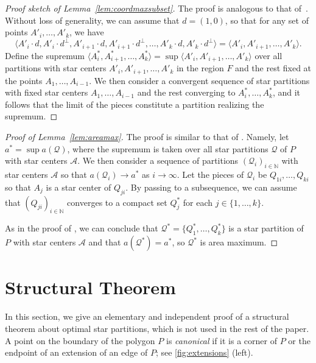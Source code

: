 \documentclass[10pt,a4paper]{article}
\newcommand{\NN}{\mathbb{N}}
\begin{document}
\begin{proof}[Proof sketch of Lemma~\ref{lem:coordmaxsubset}]
The proof is analogous to that of~.
Without loss of generality, we can assume that $d=(1,0)$, so that for any set of points $A'_i,\ldots,A'_k$, we have
\[\langle A'_i\cdot d, A'_i\cdot d^\perp,A'_{i+1}\cdot d, A'_{i+1}\cdot d^\perp,\ldots,A'_k\cdot d,A'_k\cdot d^\perp\rangle=\langle A'_i,A'_{i+1},\ldots,A'_k\rangle.\]
Define the supremum $\langle A^*_i,A^*_{i+1},\ldots,A^*_k\rangle=\sup \langle A'_i,A'_{i+1},\ldots,A'_k\rangle$ over all partitions with star centers $A'_i,A'_{i+1},\ldots,A'_k$ in the region $F$ and the rest fixed at the points $A_1,\ldots,A_{i-1}$.
We then consider a convergent sequence of star partitions with fixed star centers $A_1,\ldots,A_{i-1}$ and the rest converging to $A^*_i,\ldots,A^*_k$, and it follows that the limit of the pieces constitute a partition realizing the supremum.
\end{proof}

\begin{proof}[Proof of Lemma~\ref{lem:areamax}]
The proof is similar to that of .
Namely, let $a^*=\sup a(\mathcal Q)$, where the supremum is taken over all star partitions $\mathcal Q$ of $P$ with star centers $\mathcal A$.
We then consider a sequence of partitions $(\mathcal Q_i)_{i\in\NN}$ with star centers $\mathcal A$ so that $a(\mathcal Q_i)\longrightarrow a^*$ as $i\longrightarrow\infty$.
Let the pieces of $\mathcal Q_i$ be $Q_{1i},\ldots,Q_{ki}$ so that $A_j$ is a star center of $Q_{ji}$.
By passing to a subsequence, we can assume that $(Q_{ji})_{i\in\NN}$ converges to a compact set $Q_j^*$ for each $j\in\{1,\ldots,k\}$.

As in the proof of , we can conclude that $\mathcal Q^*=\{Q_1^*,\ldots,Q_k^*\}$ is a star partition of $P$ with star centers $\mathcal A$ and that $a(\mathcal Q^*)=a^*$, so $\mathcal Q^*$ is area maximum.
\end{proof}

\section{Structural Theorem}
\label{app:struct}

In this section, we give an elementary and independent proof of a structural theorem about optimal star partitions, which is not used in the rest of the paper.
A point on the boundary of the polygon $P$ is \emph{canonical} if it is a corner of $P$ or the endpoint of an extension of an edge of $P$; see \cref{fig:extensions} (left).
\end{document}
